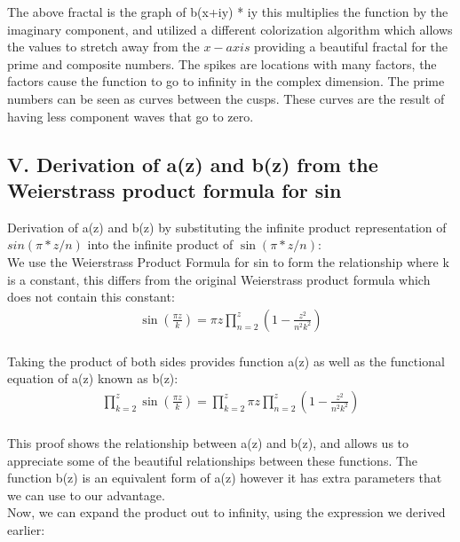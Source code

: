 \documentclass{article}
\begin{document}
The above fractal is the graph of b(x+iy) * iy this multiplies the function by the imaginary component, and utilized a different colorization algorithm which allows the values to stretch away from the $x-axis$ providing a beautiful fractal for the prime and composite numbers. The spikes are locations with many factors, the factors cause the function to go to infinity in the complex dimension. The prime numbers can be seen as curves between the cusps. These curves are the result of having less component waves that go to zero. \\

\newpage
\subsection*{V. Derivation of a(z) and b(z) from the Weierstrass product formula for sin}
Derivation of a(z) and b(z) by substituting the infinite product representation of $sin(\pi*z/n)$ into the infinite product of $\sin(\pi*z/n)$: \\

We use the Weierstrass Product Formula for sin to form the relationship where k is a constant, this differs from the original Weierstrass product formula which does not contain this constant: \\
\begin{align*}
	\sin\left(\frac{\pi z}{k}\right) = \pi z\prod_{n=2}^z \left(1-\frac{z^2}{n^2k^2}\right) \\
\end{align*}

Taking the product of both sides provides function a(z) as well as the functional equation of a(z) known as b(z): \\
\begin{align*}
	\prod_{k=2}^z\sin\left(\frac{\pi z}{k}\right) = \prod_{k=2}^z \pi z\prod_{n=2}^z \left(1-\frac{z^2}{n^2k^2}\right) \\
\end{align*}

This proof shows the relationship between a(z) and b(z), and allows us to appreciate some of the beautiful relationships between these functions. The function b(z) is an equivalent form of a(z) however it has extra parameters that we can use to our advantage. \\

Now, we can expand the product out to infinity, using the expression we derived earlier:
\end{document}
